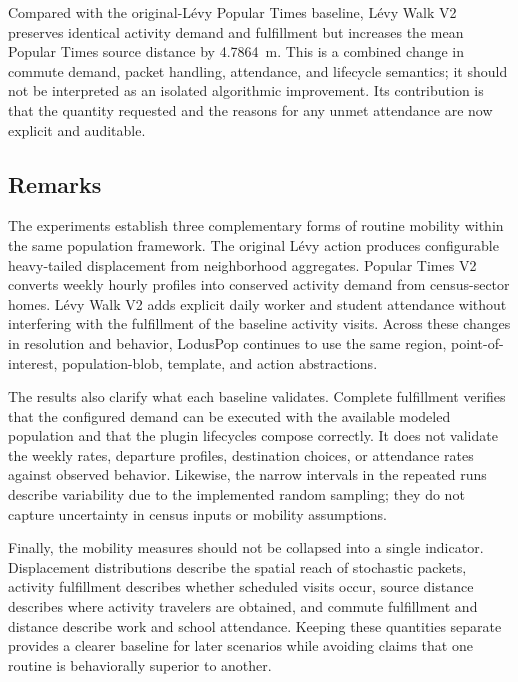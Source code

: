 Compared with the original-L\'evy Popular Times baseline, L\'evy Walk V2 preserves identical activity demand and fulfillment but increases the mean Popular Times source distance by 4.7864~m. This is a combined change in commute demand, packet handling, attendance, and lifecycle semantics; it should not be interpreted as an isolated algorithmic improvement. Its contribution is that the quantity requested and the reasons for any unmet attendance are now explicit and auditable.

\subsection{Remarks}

The experiments establish three complementary forms of routine mobility within the same population framework. The original L\'evy action produces configurable heavy-tailed displacement from neighborhood aggregates. Popular Times V2 converts weekly hourly profiles into conserved activity demand from census-sector homes. L\'evy Walk V2 adds explicit daily worker and student attendance without interfering with the fulfillment of the baseline activity visits. Across these changes in resolution and behavior, LodusPop continues to use the same region, point-of-interest, population-blob, template, and action abstractions.

The results also clarify what each baseline validates. Complete fulfillment verifies that the configured demand can be executed with the available modeled population and that the plugin lifecycles compose correctly. It does not validate the weekly rates, departure profiles, destination choices, or attendance rates against observed behavior. Likewise, the narrow intervals in the repeated runs describe variability due to the implemented random sampling; they do not capture uncertainty in census inputs or mobility assumptions.

Finally, the mobility measures should not be collapsed into a single indicator. Displacement distributions describe the spatial reach of stochastic packets, activity fulfillment describes whether scheduled visits occur, source distance describes where activity travelers are obtained, and commute fulfillment and distance describe work and school attendance. Keeping these quantities separate provides a clearer baseline for later scenarios while avoiding claims that one routine is behaviorally superior to another.
